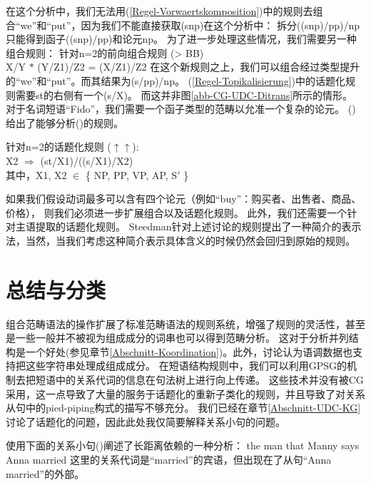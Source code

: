 在这个分析中，我们无法用(\ref{Regel-Vorwaertskomposition})中的规则去组合``we''和``put''，因为我们不能直接获取(s\bs np)在这个分析中：
拆分((s\bs np)/pp)/np只能得到函子((s\bs np)/pp)和论元np。
为了进一步处理这些情况，我们需要另一种组合规则：
\ea
针对n=2的前向组合规则 (> BB)\\
X/Y $*$ (Y/Z1)/Z2 = (X/Z1)/Z2
\z
在这个新规则之上，我们可以组合经过类型提升的``{we}''和``{put}''。而其结果为(s/pp)/np。
(\ref{Regel-Topikalisierung})中的话题化规则需要st的右侧有一个(s/X)。
而这并非图\ref{abb-CG-UDC-Ditrans}所示的情形。
对于名词短语``{Fido}''，我们需要一个函子类型的范畴以允准一个复杂的论元。
()给出了能够分析()的规则。

\ea
\label{Regel-Topikalisierung-zwei}
针对n=2的话题化规则 ($\uparrow\uparrow$\is{$\uparrow\uparrow$}):\\
X2 $\Rightarrow$ (st/X1)/((s/X1)/X2)\\
其中，X1, X2 $\in$ \{ NP, PP, VP, AP, S$'$ \}
\z

\noindent
如果我们假设动词最多可以含有四个论元（例如``buy''：购买者、出售者、商品、价格），
则我们必须进一步扩展组合以及话题化规则。
此外，我们还需要一个针对主语提取的话题化规则\citep[]{Pollard88a}。
Steedman针对上述讨论的规则提出了一种简介的表示法，当然，当我们考虑这种简介表示具体含义的时候仍然会回归到原始的规则。

\section{总结与分类}
\label{Abschnitt-Relativsaetze-CG}\label{Abschnitt-Ratte-CG}\label{sec-pied-piping-cg}

组合范畴语法的操作扩展了标准范畴语法的规则系统，增强了规则的灵活性，甚至是一些一般并不被视为组成成分的词串也可以得到范畴分析。
这对于分析并列结构是一个好处(参见章节\ref{Abschnitt-Koordination})。此外，\citet{Steedman91a}讨论认为语调数据也支持把这些字符串处理成组成成分。
在短语结构规则中，我们可以利用GPSG的机制去把短语中的关系代词的信息在句法树上进行向上传递。
这些技术并没有被CG采用，这一点导致了大量的服务于话题化的重新子类化的规则，并且导致了对关系从句中的pied-piping构式的描写不够充分。
我们已经在章节\ref{Abschnitt-UDC-KG}讨论了话题化的问题，因此此处我仅简要解释关系小句的问题。

\citet[]{SB2006a-u}使用下面的关系小句()阐述了长距离依赖的一种分析：
\ea
the man  that Manny says Anna married
\z
这里的关系代词是``married''的宾语，但出现在了从句``Anna married''的外部。

